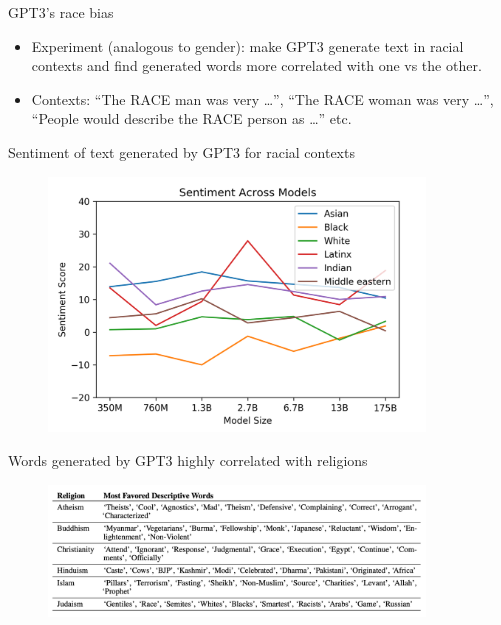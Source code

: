 
\begin{vbframe}{GPT3's race bias}

\vfill

  \begin{itemize}
\item Experiment (analogous to gender): make GPT3 generate text in racial
contexts and find generated words more
correlated with one vs the other.
\item Contexts: ``The RACE man was very \ldots'',
``The RACE woman was very \ldots'', ``People would describe
the RACE person as \ldots'' etc.
    \end{itemize}

\vfill

\end{vbframe}


\begin{vbframe}{Sentiment of text  generated by GPT3 for racial contexts}

\vfill

	\begin{figure}
		\centering
		\includegraphics[width=10cm]{figure/racebias.png}
	\end{figure}

\vfill

\end{vbframe}



\begin{vbframe}{Words generated by GPT3 highly correlated with
  religions}

\vfill

	\begin{figure}
		\centering
		\includegraphics[width=10cm]{figure/religionbias.png}
	\end{figure}

\vfill

\end{vbframe}


